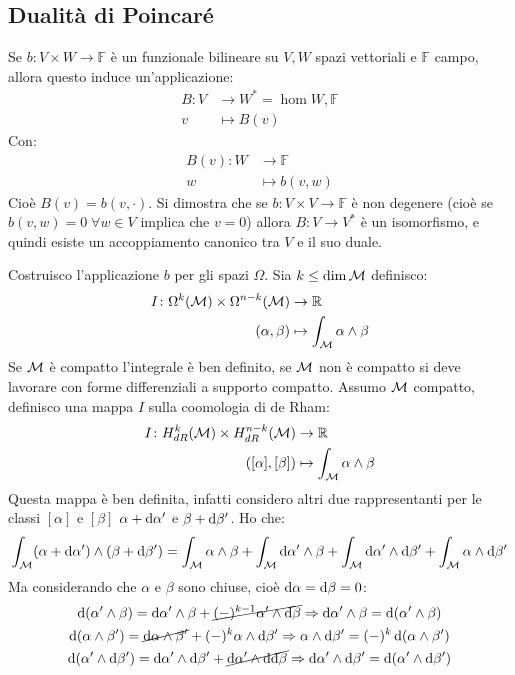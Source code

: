 \subsection{Dualità di Poincaré}
\begin{osservation}
  Se $ b \colon V \times W \to \mathbb{F} $ è un funzionale bilineare su $ V,W $ spazi
  vettoriali e $ \mathbb{F} $ campo, allora questo induce un'applicazione:
  \begin{align*}
    B \colon V & \to W^* = \hom{W, \mathbb{F}} \\
    v & \mapsto B(v)
  \end{align*}
  Con:
  \begin{align*}
    B(v) \colon W & \to \mathbb{F} \\
    w & \mapsto b(v,w)
  \end{align*}
  Cioè $ B(v) = b(v, \cdot) $. Si dimostra che se $ b \colon V \times V \to \mathbb{F} $
  è non degenere (cioè se $ b(v,w) = 0 \; \forall w \in V $ implica che $ v = 0$) allora
  $ B \colon V \to V^* $ è un isomorfismo, e quindi esiste un accoppiamento canonico tra
  $ V $ e il suo duale.
\end{osservation}
Costruisco l'applicazione $ b $ per gli spazi $ \Omega $. Sia $ k \leq \dim \mathcal{M} $ definisco:
\begin{align*}
  I \colon \Omega^k(\mathcal{M}) \times \Omega^{n-k}(\mathcal{M}) & \to \mathbb{R}^{} \\
  (\alpha,\beta) & \mapsto \int_{\mathcal{M}} \alpha \wedge \beta
\end{align*}
Se $ \mathcal{M} $ è compatto l'integrale è ben definito, se $ \mathcal{M} $ non è compatto si
deve lavorare con forme differenziali a supporto compatto. Assumo $ \mathcal{M} $
compatto, definisco una mappa $ I $ sulla coomologia di de Rham:
\begin{align*}
  I \colon H^k_{dR}(\mathcal{M}) \times H^{n-k}_{dR}(\mathcal{M}) & \to \mathbb{R}^{} \\
  ([\alpha], [\beta]) & \mapsto \int_{\mathcal{M}} \alpha \wedge \beta
\end{align*}
Questa mappa è ben definita, infatti considero altri due rappresentanti per le
classi $ [\alpha] $ e $ [\beta] $ $ \alpha + \operatorname{d}\!{\alpha}' $ e $ \beta + \operatorname{d}\!{\beta}' $. Ho che:
\[
  \int_{\mathcal{M}} (\alpha + \operatorname{d}\!{\alpha}') \wedge (\beta + \operatorname{d}\!{\beta}') = \int_{\mathcal{M}} \alpha \wedge \beta + \int_{\mathcal{M}} \operatorname{d}\!{\alpha}' \wedge \beta + \int_{\mathcal{M}} \operatorname{d}\!{\alpha}' \wedge \operatorname{d}\!{\beta}' + \int_{\mathcal{M}} \alpha \wedge \operatorname{d}\!{\beta}'
\]
Ma considerando che $ \alpha $ e $ \beta $ sono chiuse, cioè $ \operatorname{d}\!{\alpha} = \operatorname{d}\!{\beta} = 0 $:
\begin{gather*}
  \d (\alpha' \wedge \beta) = \d \alpha' \wedge \beta + \cancel{(-)^{k-1} \alpha' \wedge \d \beta} \Rightarrow  \d \alpha' \wedge \beta = \d (\alpha' \wedge \beta) \\
  \d (\alpha \wedge \beta') = \cancel{\d \alpha \wedge \beta'} + (-)^{k} \alpha \wedge \d \beta' \Rightarrow  \alpha \wedge \d \beta' = (-)^k  \d (\alpha \wedge \beta') \\
  \d (\alpha' \wedge \d \beta') = \d \alpha' \wedge \d \beta' + \cancel{\d \alpha' \wedge \d {\d \beta}} \Rightarrow \d \alpha' \wedge \d \beta' =  \d (\alpha' \wedge \d \beta')
\end{gather*}
